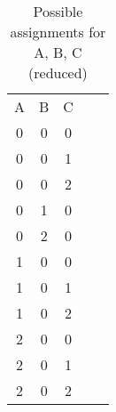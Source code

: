 \documentclass[12pt, letterpaper, oneside]{book}
\begin{document}
\begin{table}[H]
  \centering
  \begin{tabular}{|c|c|c|ll}
    \cline{1-3}
    A & B & C &  & \\ [1ex] \cline{1-3}
    0 & 0 & 0 &  & \\ [0.5ex] \cline{1-3}
    0 & 0 & 1 &  & \\ [0.5ex] \cline{1-3}
    0 & 0 & 2 &  & \\ [0.5ex] \cline{1-3}
    0 & 1 & 0 &  & \\ [0.5ex] \cline{1-3}
    0 & 2 & 0 &  & \\ [0.5ex] \cline{1-3}
    1 & 0 & 0 &  & \\ [0.5ex] \cline{1-3}
    1 & 0 & 1 &  & \\ [0.5ex] \cline{1-3}
    1 & 0 & 2 &  & \\ [0.5ex] \cline{1-3}
    2 & 0 & 0 &  & \\ [0.5ex] \cline{1-3}
    2 & 0 & 1 &  & \\ [0.5ex] \cline{1-3}
    2 & 0 & 2 &  & \\ [0.5ex] \cline{1-3}
  \end{tabular}
  \caption{Possible assignments for A, B, C (reduced)}
  \label{table:1.1.8-1b}
\end{table}
\end{document}
